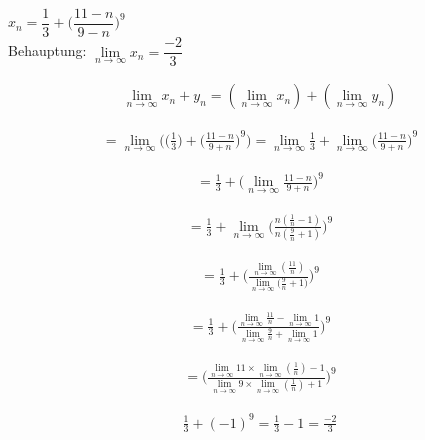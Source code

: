 \begin{example}
    $x_n = \dfrac{1}{3} + \big(\dfrac{11-n}{9-n}\big)^9$\\
Behauptung: $\lim\limits_{n \rightarrow \infty}{x_n}=\dfrac{-2}{3}$

\newpage
    \begin{lemma}
        \begin{gather}
            \lim\limits_{n \rightarrow \infty}{x_n+y_n}=
            (\lim\limits_{n \rightarrow \infty}{x_n}) +
            (\lim\limits_{n \rightarrow \infty}{y_n})
        \end{gather}
    \end{lemma}

    \begin{gather}
        =\lim\limits_{n \rightarrow \infty}{\bigg(\big(\frac{1}{3}\big)+\bigg(\frac{11-n}{9+n}\bigg)^9\bigg)}
        = \lim\limits_{n \rightarrow \infty}{\frac{1}{3}+
        \lim\limits_{n \rightarrow \infty}{\bigg(\frac{11-n}{9+n}\bigg)^9}}
    \end{gather}

    \begin{gather}
        = \frac{1}{3} + \bigg(\lim\limits_{n \rightarrow \infty}{\frac{11-n}{9+n}}\bigg)^9
    \end{gather}


    \begin{gather}
        = \frac{1}{3} + \lim\limits_{n \rightarrow \infty}{\Bigg(\frac{n(\frac{1}{n}-1)}{n(\frac{9}{n}+1)}\Bigg)^9}
    \end{gather}

    \begin{gather}
        = \frac{1}{3}+\Bigg(\frac{\lim\limits_{n \rightarrow \infty}{(\frac{11}{n})}}{\lim\limits_{n \rightarrow \infty}{(\frac{9}{n}+1})}\Bigg)^9
    \end{gather}

    \begin{gather}
        = \frac{1}{3} + \Bigg(
        \frac{\lim\limits_{n \rightarrow \infty}{\frac{11}{n}} - \lim\limits_{n \rightarrow \infty}{1}}{\lim\limits_{n \rightarrow \infty}{\frac{9}{n}+\lim\limits_{n \rightarrow \infty}{1} } }   \Bigg)^9
    \end{gather}


    \begin{gather}
        =\Bigg(
        \frac{\lim\limits_{n \rightarrow \infty}{11} \times \lim\limits_{n \rightarrow \infty}{(\frac{1}{n})-1}}{\lim\limits_{n \rightarrow \infty}{9 \times \lim\limits_{n \rightarrow \infty}{(\frac{1}{n})+1} } }   \Bigg)^9
    \end{gather}

    \begin{gather}
        \frac{1}{3}+(-1)^9 = \frac{1}{3}-1 = \frac{-2}{3}
    \end{gather}
\end{example}

